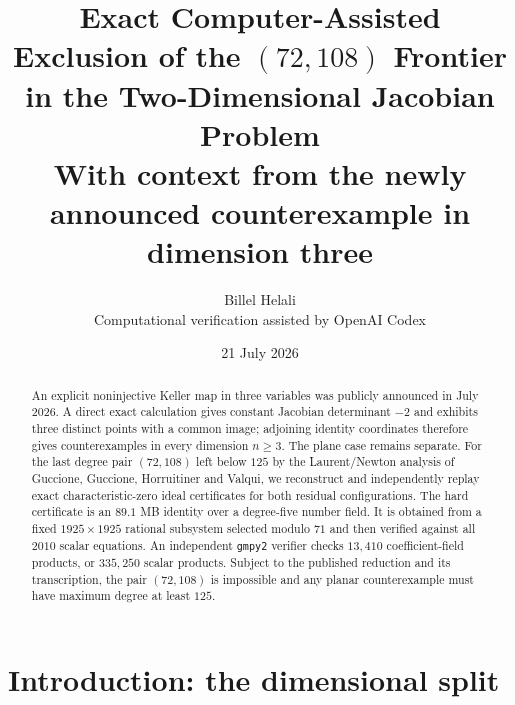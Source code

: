 \documentclass[11pt,a4paper]{article}
\title{\textbf{Exact Computer-Assisted Exclusion of the $(72,108)$ Frontier\\in the Two-Dimensional Jacobian Problem}\vspace{0.5em}\\
\large With context from the newly announced counterexample in dimension three}
\author{Billel Helali\\\small Computational verification assisted by OpenAI Codex}
\date{21 July 2026}
\theoremstyle{remark}
\begin{document}
\maketitle

\begin{center}
\end{center}

\begin{abstract}
An explicit noninjective Keller map in three variables was publicly announced in July 2026. A direct exact calculation gives constant Jacobian determinant $-2$ and exhibits three distinct points with a common image; adjoining identity coordinates therefore gives counterexamples in every dimension $n\geq 3$. The plane case remains separate. For the last degree pair $(72,108)$ left below $125$ by the Laurent/Newton analysis of Guccione, Guccione, Horruitiner and Valqui, we reconstruct and independently replay exact characteristic-zero ideal certificates for both residual configurations. The hard certificate is an $89.1$ MB identity over a degree-five number field. It is obtained from a fixed $1925\times1925$ rational subsystem selected modulo $71$ and then verified against all $2010$ scalar equations. An independent \texttt{gmpy2} verifier checks $13{,}410$ coefficient-field products, or $335{,}250$ scalar products. Subject to the published reduction and its transcription, the pair $(72,108)$ is impossible and any planar counterexample must have maximum degree at least $125$.
\end{abstract}

\tableofcontents

\section{Introduction: the dimensional split}
\end{document}
